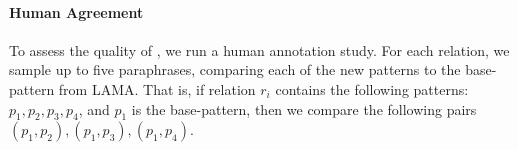 








\paragraph{Human Agreement}
To assess the quality of \resource{}, we run a
human annotation study.
For each relation, we sample up to
five paraphrases, comparing each of the new patterns to the
base-pattern from LAMA.
That is, if relation $r_i$ contains the following patterns:
$p_1, p_2, p_3, p_4$, and $p_1$ is the
base-pattern, then we compare the following pairs $(p_1, p_2), (p_1, p_3), (p_1,p_4)$.

